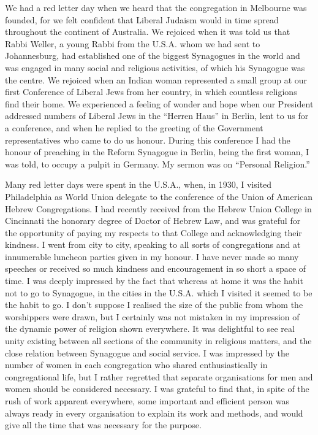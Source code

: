We had a red letter day when we heard that the
congregation in Melbourne was founded, for we felt
confident that Liberal Judaism would in time spread
throughout the continent of Australia. We rejoiced
when it was told us that Rabbi Weller, a young Rabbi
from the U.S.A. whom we had sent to Johannesburg,
had established one of the biggest Synagogues in the
world and was engaged in many social and religious
activities, of which his Synagogue was the centre. We
rejoiced when an Indian woman represented a small
group at our first Conference of Liberal Jews from her
country, in which countless religions find their home.
We experienced a feeling of wonder and hope when our
President addressed numbers of Liberal Jews in the
“Herren Haus” in Berlin, lent to us for a conference,
and when he replied to the greeting of the Government
representatives who came to do us honour. During this
conference I had the honour of preaching in the Reform
Synagogue in Berlin, being the first woman, I was told,
to occupy a pulpit in Germany. My sermon was on
“Personal Religion.”

Many red letter days were spent in the U.S.A.,
when, in 1930, I visited Philadelphia as World Union
delegate to the conference of the Union of American
Hebrew Congregations. I had recently received
from the Hebrew Union College in Cincinnati the
honorary degree of Doctor of Hebrew Law, and
was grateful for the opportunity of paying my
respects to that College and acknowledging their kindness.
I went from city to city, speaking to all
sorts of congregations and at innumerable luncheon
parties given in my honour. I have never made so many
speeches or received so much kindness and encouragement
in so short a space of time. I was deeply impressed by the
fact that whereas at home it was the habit not to go to
Synagogue, in the cities in the U.S.A. which I visited it
seemed to be the habit to go. I don’t suppose I realised
the size of the public from whom the worshippers were
drawn, but I certainly was not mistaken in my impression
of the dynamic power of religion shown everywhere. It
was delightful to see real unity existing between all
sections of the community in religious matters, and the
close relation between Synagogue and social service. I
was impressed by the number of women in each congregation
who shared enthusiastically in congregational life,
but I rather regretted that separate organisations
for men and women should be considered necessary. I
was grateful to find that, in spite of the rush of work
apparent everywhere, some important and efficient
person was always ready in every organisation to explain
its work and methods, and would give all the time that
was necessary for the purpose.

